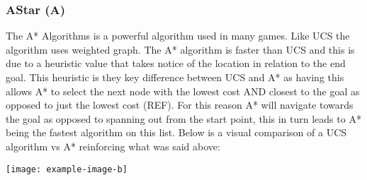 \subsubsection{AStar (A\*)}
The A* Algorithms is a powerful algorithm used in many games. Like UCS the algorithm uses weighted graph. The A* algorithm is faster than UCS and this is due to a heuristic value that takes notice of the location in relation to the end goal. This heuristic is they key difference between UCS and A* as having this allows A* to select the next node with the lowest cost AND closest to the goal as opposed to just the lowest cost (REF). For this reason A* will navigate towards the goal as opposed to spanning out from the start point, this in turn leads to A* being the fastest algorithm on this list. 
Below is a visual comparison of a UCS algorithm vs A* reinforcing what was said above:
\begin{center}
	\texttt{[image: example-image-b]}
\end{center}

